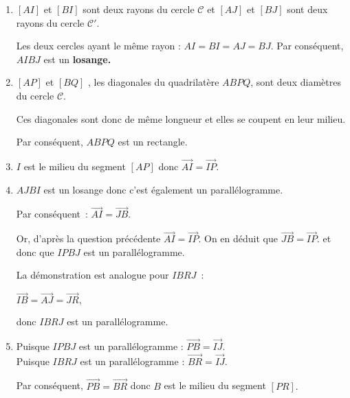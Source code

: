 \begin{corrige}

\begin{enumerate}
\item
$ [AI] $ et $ [BI] $ sont deux rayons du cercle  $ \mathscr{C} $ et  $ [AJ] $ et $ [BJ] $ sont deux rayons du cercle  $ \mathscr{C}' $.
\par
Les deux cercles ayant le même rayon : $ AI=BI=AJ=BJ $. Par conséquent, $ AIBJ $ est un  \textbf{losange.} 

\item
$ [AP] $ et $ [BQ] $ , les diagonales du quadrilatère  $ ABPQ $, sont deux diamètres du cercle $ \mathscr{C}  $.
\par
Ces diagonales sont donc de même longueur et elles se coupent en leur milieu.
\par
Par conséquent,  $ ABPQ $ est un rectangle.

\item
$I$ est le milieu du segment $ [AP] $ donc $  \overrightarrow{ AI } =  \overrightarrow{ IP }. $


\item
$ AJBI $ est un losange donc c'est également un parallélogramme.
\par
Par conséquent~: $  \overrightarrow{ AI } =  \overrightarrow{ JB }. $
\par
Or, d'après la question précédente  $  \overrightarrow{ AI } =  \overrightarrow{ IP }. $ On en déduit que  $  \overrightarrow{ JB } =  \overrightarrow{ IP }. $ et donc que  $ IPBJ $ est un parallélogramme.
\par
La démonstration est analogue pour $ IBRJ $~:
\par
$  \overrightarrow{ IB } =  \overrightarrow{ AJ } =  \overrightarrow{ JR }, $
\par
donc   $ IBRJ $ est un parallélogramme.

\item
Puisque $ IPBJ $ est un parallélogramme :  $  \overrightarrow{ PB } =  \overrightarrow{ IJ }.  $
\\
Puisque $ IBRJ $ est un parallélogramme :  $  \overrightarrow{ BR } =  \overrightarrow{ IJ }.  $
\par
Par conséquent,  $  \overrightarrow{ PB } =  \overrightarrow{ BR }$   donc  $B$ est le milieu du segment $ [PR].$
\end{enumerate}
\end{corrige}


